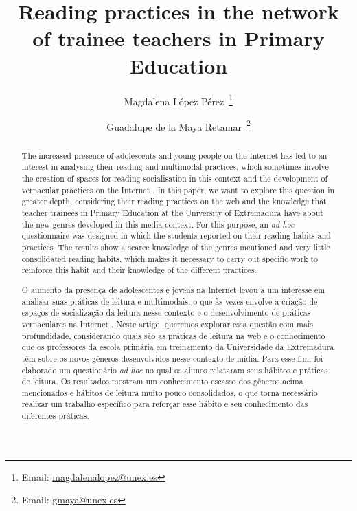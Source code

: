 \documentclass[english]{textolivre}
\title{Reading practices in the network of trainee teachers in Primary Education}
\author[1]{Magdalena López Pérez~\orcid{0000-0001-6233-1719}\thanks{Email: \href{mailto:magdalenalopez@unex.es}{magdalenalopez@unex.es}}}
\author[1]{Guadalupe de la Maya Retamar~\orcid{0000-0003-4201-4024}\thanks{Email: \href{mailto:gmaya@unex.es}{gmaya@unex.es}}}
\affil[1]{Universidad de Extremadura, Facultad de Educación y Psicología, Departamento de Didáctica de las Ciencias Sociales, las Lenguas y las Literaturas, Badajoz, España.}
\begin{document}
\maketitle

\begin{polyabstract}
\begin{abstract}
The increased presence of adolescents and young people on the Internet has led to an interest in analysing their reading and multimodal practices, which sometimes involve the creation of spaces for reading socialisation in this context and the development of vernacular practices on the Internet \cite{cassany_en_linea._2012}. In this paper, we want to explore this question in greater depth, considering their reading practices on the web and the knowledge that teacher trainees in Primary Education at the University of Extremadura have about the new genres developed in this media context. For this purpose, an \textit{ad hoc} questionnaire was designed in which the students reported on their reading habits and practices. The results show a scarce knowledge of the genres mentioned and very little consolidated reading habits, which makes it necessary to carry out specific work to reinforce this habit and their knowledge of the different practices.

\end{abstract}

\begin{portuguese}
\begin{abstract}
O aumento da presença de adolescentes e jovens na Internet levou a um interesse em analisar suas práticas de leitura e multimodais, o que às vezes envolve a criação de espaços de socialização da leitura nesse contexto e o desenvolvimento de práticas vernaculares na Internet \cite{cassany_en_linea._2012}. Neste artigo, queremos explorar essa questão com mais profundidade, considerando quais são as práticas de leitura na web e o conhecimento que os professores da escola primária em treinamento da Universidade da Extremadura têm sobre os novos gêneros desenvolvidos nesse contexto de mídia. Para esse fim, foi elaborado um questionário \textit{ad hoc} no qual os alunos relataram seus hábitos e práticas de leitura. Os resultados mostram um conhecimento escasso dos gêneros acima mencionados e hábitos de leitura muito pouco consolidados, o que torna necessário realizar um trabalho específico para reforçar esse hábito e seu conhecimento das diferentes práticas. 

\end{abstract}
\end{portuguese}
\end{polyabstract}
\end{document}
